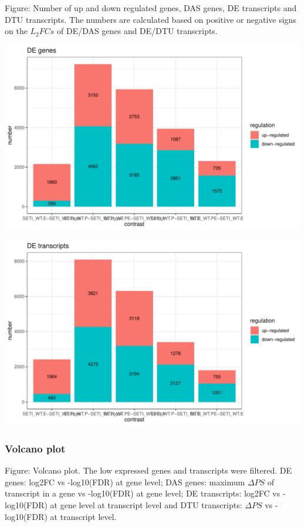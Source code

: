 \documentclass[]{article}
\begin{document}
Figure: Number of up and down regulated genes, DAS genes, DE transcripts
and DTU transcripts. The numbers are calculated based on positive or
negative signs on the \(L_2FCs\) of DE/DAS genes and DE/DTU transcripts.

\includegraphics[width=16.67in]{X2024.08.05.11.24.04.j284/figure/DE genes up and down regulation numbers}

\includegraphics[width=16.67in]{X2024.08.05.11.24.04.j284/figure/DE transcripts up and down regulation numbers}

\subsubsection{Volcano plot}\label{volcano-plot}

Figure: Volcano plot. The low expressed genes and transcripts were
filtered. DE genes: log2FC vs -log10(FDR) at gene level; DAS genes:
maximum \(\Delta PS\) of transcript in a gene vs -log10(FDR) at gene
level; DE transcripts: log2FC vs -log10(FDR) at gene level at transcript
level and DTU transcripts: \(\Delta PS\) vs -log10(FDR) at transcript
level.
\end{document}
